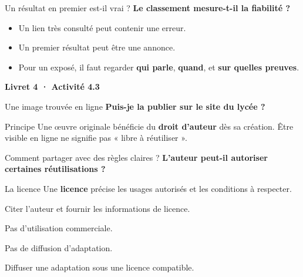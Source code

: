 \documentclass[aspectratio=169,11pt]{beamer}
\newcommand{\question}[1]{{\Large\color{or}\bfseries #1}}
\begin{document}
\begin{frame}{Un résultat en premier est-il vrai ?}
\question{Le classement mesure-t-il la fiabilité ?}
\vspace{6mm}
\begin{itemize}\setlength{\itemsep}{6mm}
\item Un lien très consulté peut contenir une erreur.
\pause
\item Un premier résultat peut être une annonce.
\pause
\item Pour un exposé, il faut regarder \textbf{qui parle}, \textbf{quand}, et \textbf{sur quelles preuves}.
\end{itemize}
\vfill
\begin{center}{\Large\color{or}\bfseries Livret 4 · Activité 4.3}\end{center}
\end{frame}

\begin{frame}{Une image trouvée en ligne}
\question{Puis-je la publier sur le site du lycée ?}
\vspace{6mm}
\begin{center}
\end{center}
\pause
\begin{block}{Principe}
Une œuvre originale bénéficie du \textbf{droit d'auteur} dès sa création. Être visible en ligne ne signifie pas « libre à réutiliser ».
\end{block}
\end{frame}

\begin{frame}{Comment partager avec des règles claires ?}
\question{L'auteur peut-il autoriser certaines réutilisations ?}
\vspace{5mm}
\pause
\begin{block}{La licence}
Une \textbf{licence} précise les usages autorisés et les conditions à respecter.
\end{block}
\vspace{6mm}
\begin{description}\setlength{\itemsep}{3mm}
\item[BY] Citer l'auteur et fournir les informations de licence.
\item[NC] Pas d'utilisation commerciale.
\item[ND] Pas de diffusion d'adaptation.
\item[SA] Diffuser une adaptation sous une licence compatible.
\end{description}
\end{frame}
\end{document}
